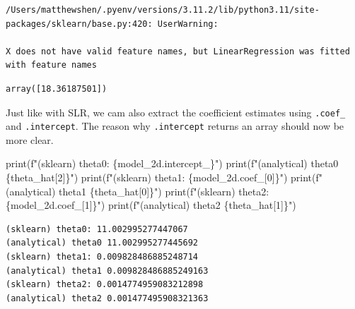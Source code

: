 \documentclass[
  letterpaper,
  DIV=11,
  numbers=noendperiod]{scrreprt}
\newenvironment{Shaded}{\begin{snugshade}}{\end{snugshade}}
\newcommand{\BuiltInTok}[1]{\textcolor[rgb]{0.00,0.23,0.31}{#1}}
\newcommand{\DecValTok}[1]{\textcolor[rgb]{0.68,0.00,0.00}{#1}}
\newcommand{\NormalTok}[1]{\textcolor[rgb]{0.00,0.23,0.31}{#1}}
\newcommand{\SpecialCharTok}[1]{\textcolor[rgb]{0.37,0.37,0.37}{#1}}
\newcommand{\SpecialStringTok}[1]{\textcolor[rgb]{0.13,0.47,0.30}{#1}}
\begin{document}
\begin{verbatim}
/Users/matthewshen/.pyenv/versions/3.11.2/lib/python3.11/site-packages/sklearn/base.py:420: UserWarning:

X does not have valid feature names, but LinearRegression was fitted with feature names
\end{verbatim}

\begin{verbatim}
array([18.36187501])
\end{verbatim}

Just like with SLR, we cam also extract the coefficient estimates using
\texttt{.coef\_} and \texttt{.intercept}. The reason why
\texttt{.intercept} returns an array should now be more clear.

\begin{Shaded}
\begin{Highlighting}[]
\BuiltInTok{print}\NormalTok{(}\SpecialStringTok{f"(sklearn) theta0: }\SpecialCharTok{\{}\NormalTok{model\_2d}\SpecialCharTok{.}\NormalTok{intercept\_}\SpecialCharTok{\}}\SpecialStringTok{"}\NormalTok{)}
\BuiltInTok{print}\NormalTok{(}\SpecialStringTok{f"(analytical) theta0 }\SpecialCharTok{\{}\NormalTok{theta\_hat[}\DecValTok{2}\NormalTok{]}\SpecialCharTok{\}}\SpecialStringTok{"}\NormalTok{)}
\BuiltInTok{print}\NormalTok{(}\SpecialStringTok{f"(sklearn) theta1: }\SpecialCharTok{\{}\NormalTok{model\_2d}\SpecialCharTok{.}\NormalTok{coef\_[}\DecValTok{0}\NormalTok{]}\SpecialCharTok{\}}\SpecialStringTok{"}\NormalTok{)}
\BuiltInTok{print}\NormalTok{(}\SpecialStringTok{f"(analytical) theta1 }\SpecialCharTok{\{}\NormalTok{theta\_hat[}\DecValTok{0}\NormalTok{]}\SpecialCharTok{\}}\SpecialStringTok{"}\NormalTok{)}
\BuiltInTok{print}\NormalTok{(}\SpecialStringTok{f"(sklearn) theta2: }\SpecialCharTok{\{}\NormalTok{model\_2d}\SpecialCharTok{.}\NormalTok{coef\_[}\DecValTok{1}\NormalTok{]}\SpecialCharTok{\}}\SpecialStringTok{"}\NormalTok{)}
\BuiltInTok{print}\NormalTok{(}\SpecialStringTok{f"(analytical) theta2 }\SpecialCharTok{\{}\NormalTok{theta\_hat[}\DecValTok{1}\NormalTok{]}\SpecialCharTok{\}}\SpecialStringTok{"}\NormalTok{)}
\end{Highlighting}
\end{Shaded}

\begin{verbatim}
(sklearn) theta0: 11.002995277447067
(analytical) theta0 11.002995277445692
(sklearn) theta1: 0.009828486885248714
(analytical) theta1 0.009828486885249163
(sklearn) theta2: 0.0014774959083212898
(analytical) theta2 0.001477495908321363
\end{verbatim}
\end{document}
